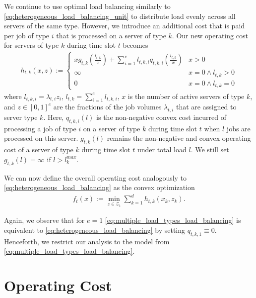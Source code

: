 We continue to use optimal load balancing similarly to \autoref{eq:heterogeneous_load_balancing_unit} to distribute load evenly across all servers of the same type. However, we introduce an additional cost that is paid per job of type $i$ that is processed on a server of type $k$. Our new operating cost for servers of type $k$ during time slot $t$ becomes \begin{align}\label{eq:multiple_load_types_load_balancing_unit}
    h_{t,k}(x,z) := \begin{cases}
        x g_{t,k}\left(\frac{l_{t,k}}{x}\right) + \sum_{i=1}^e l_{t,k,i} q_{t,k,i}\left(\frac{l_{t,k}}{x}\right) & x > 0 \\
        \infty                                                                                                   & x = 0 \land l_{t,k} > 0 \\
        0                                                                                                        & x = 0 \land l_{t,k} = 0
    \end{cases}
\end{align} where $l_{t,k,i} = \lambda_{t,i} z_i$, $l_{t,k} = \sum_{i=1}^e l_{t,k,i}$, $x$ is the number of active servers of type $k$, and $z \in [0,1]^e$ are the fractions of the job volumes $\lambda_{t,i}$ that are assigned to server type $k$. Here, $q_{t,k,i}(l)$ is the non-negative convex cost incurred of processing a job of type $i$ on a server of type $k$ during time slot $t$ when $l$ jobs are processed on this server. $g_{t,k}(l)$ remains the non-negative and convex operating cost of a server of type $k$ during time slot $t$ under total load $l$. We still set $g_{t,k}(l) = \infty$ if $l > l_k^{max}$.

We can now define the overall operating cost analogously to \autoref{eq:heterogeneous_load_balancing} as the convex optimization \begin{align}\label{eq:multiple_load_types_load_balancing}
    f_t(x) := \min_{z \in \mathcal{Z}_t} \sum_{k=1}^d h_{t,k}(x_k,z_k).
\end{align}

Again, we observe that for $e = 1$ \autoref{eq:multiple_load_types_load_balancing} is equivalent to \autoref{eq:heterogeneous_load_balancing} by setting $q_{t,k,1} \equiv 0$. Henceforth, we restrict our analysis to the model from \autoref{eq:multiple_load_types_load_balancing}.

\section{Operating Cost}\label{section:application:operating_cost}

